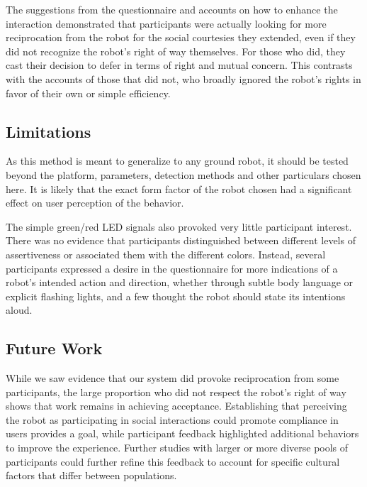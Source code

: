 \documentclass[letterpaper, 10 pt, conference]{ieeeconf}  %
\begin{document}
The suggestions from the questionnaire and accounts on how to enhance the interaction demonstrated that participants were actually looking for more reciprocation from the robot for the social courtesies they extended, even if they did not recognize the robot's right of way themselves. For those who did, they cast their decision to defer in terms of right and mutual concern. This contrasts with the accounts of those that did not, who broadly ignored the robot's rights in favor of their own or simple efficiency.

\subsection{Limitations}
As this method is meant to generalize to any ground robot, it should be tested beyond the platform, parameters, detection methods and other particulars chosen here. It is likely that the exact form factor of the robot chosen had a significant effect on user perception of the behavior. 

The simple green/red LED signals also provoked very little participant interest. There was no evidence that participants distinguished between different levels of assertiveness or associated them with the different colors. Instead, several participants expressed a desire in the questionnaire for more indications of a robot’s intended action and direction, whether through subtle body language or explicit flashing lights, and a few thought the robot should state its intentions aloud. 

\subsection{Future Work}
While we saw evidence that our system did provoke reciprocation from some participants, the large proportion who did not respect the robot's right of way shows that work remains in achieving acceptance. Establishing that perceiving the robot as participating in social interactions could promote compliance in users provides a goal, while participant feedback highlighted additional behaviors to improve the experience. Further studies with larger or more diverse pools of participants could further refine this feedback to account for specific cultural factors that differ between populations\cite{bartneck2005ssaisb}.
\end{document}
